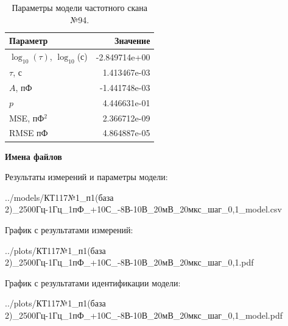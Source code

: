 \begin{table}[!ht]
    \centering
    \caption{Параметры модели частотного скана №94.}
    \begin{tabular}{|l|r|}
        \hline
        Параметр                                       & Значение                  \\ \hline
        $\log_{10}(\tau)$, $\log_{10}$(с)              & -2.849714e+00             \\ \hline
        $\tau$, с                                      & 1.413467e-03              \\ \hline
        $A$, пФ                                        & -1.441748e-03             \\ \hline
        $p$                                            & 4.446631e-01              \\ \hline
        MSE, пФ$^2$                                    & 2.366712e-09              \\ \hline
        RMSE пФ                                        & 4.864887e-05              \\ \hline
    \end{tabular}
    \label{table:frequency_scan_model_94}
\end{table}

\textbf{Имена файлов}

Результаты измерений и параметры модели:

\scriptsize../models/КТ117№1\_п1(база 2)\_2500Гц-1Гц\_1пФ\_+10С\_-8В-10В\_20мВ\_20мкс\_шаг\_0,1\_model.csv
\normalsize

График с результатами измерений:

\scriptsize../plots/КТ117№1\_п1(база 2)\_2500Гц-1Гц\_1пФ\_+10С\_-8В-10В\_20мВ\_20мкс\_шаг\_0,1.pdf
\normalsize

График с результатами идентификации модели:

\scriptsize../plots/КТ117№1\_п1(база 2)\_2500Гц-1Гц\_1пФ\_+10С\_-8В-10В\_20мВ\_20мкс\_шаг\_0,1\_model.pdf
\normalsize

